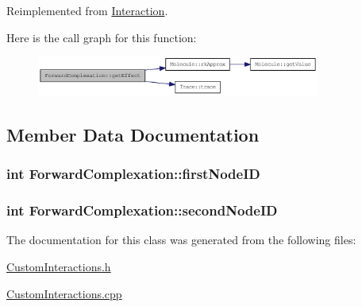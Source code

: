 Reimplemented from \hyperlink{classInteraction_a6328831e714adf9c8177f6052d2e017f}{Interaction}.

Here is the call graph for this function:\nopagebreak
\begin{figure}[H]
\begin{center}
\leavevmode
\includegraphics[width=264pt]{classForwardComplexation_a8f7f867b98b484ed0f09192ebd280e1a_cgraph}
\end{center}
\end{figure}


\subsection{Member Data Documentation}
\hypertarget{classForwardComplexation_ab8992a599d764810b7be577f88ee791c}{
\subsubsection[{firstNodeID}]{\setlength{\rightskip}{0pt plus 5cm}int {\bf ForwardComplexation::firstNodeID}}}
\label{classForwardComplexation_ab8992a599d764810b7be577f88ee791c}
\hypertarget{classForwardComplexation_a48ebe46e9ee3b749165649d8b14c33fc}{
\subsubsection[{secondNodeID}]{\setlength{\rightskip}{0pt plus 5cm}int {\bf ForwardComplexation::secondNodeID}}}
\label{classForwardComplexation_a48ebe46e9ee3b749165649d8b14c33fc}


The documentation for this class was generated from the following files:\begin{DoxyCompactItemize}
\item 
\hyperlink{CustomInteractions_8h}{CustomInteractions.h}\item 
\hyperlink{CustomInteractions_8cpp}{CustomInteractions.cpp}\end{DoxyCompactItemize}
